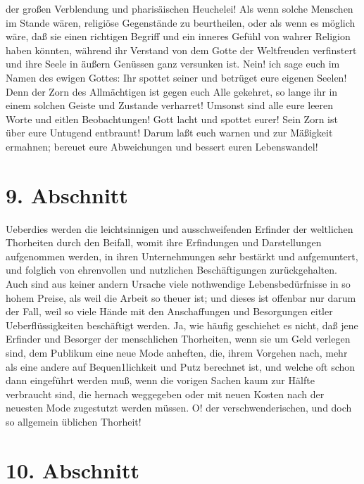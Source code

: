 der großen Verblendung und pharisäischen Heuchelei! Als wenn solche Menschen im
Stande wären, religiöse Gegenstände zu beurtheilen, oder als wenn es möglich
wäre, daß sie einen richtigen Begriff und ein inneres Gefühl von wahrer Religion
haben könnten, während ihr Verstand von dem Gotte der Weltfreuden verfinstert
und ihre Seele in äußern Genüssen ganz versunken ist. Nein! ich sage euch im
Namen des ewigen Gottes: Ihr spottet seiner und betrüget eure eigenen Seelen!
Denn der Zorn des Allmächtigen ist gegen euch Alle gekehret, so lange ihr in
einem solchen Geiste und Zustande verharret! Umsonst sind alle eure leeren Worte
und eitlen Beobachtungen! Gott lacht und spottet eurer! Sein Zorn ist über eure
Untugend entbraunt! Darum laßt euch warnen und zur Mäßigkeit ermahnen; bereuet
eure Abweichungen und bessert euren Lebenswandel!

\section{9. Abschnitt} \label{kap17_ab9}

Ueberdies werden die leichtsinnigen und ausschweifenden Erfinder der weltlichen
Thorheiten durch den Beifall, womit ihre Erfindungen und Darstellungen
aufgenommen werden, in ihren Unternehmungen sehr bestärkt und aufgemuntert, und
folglich von ehrenvollen und nutzlichen Beschäftigungen zurückgehalten. Auch
sind aus keiner andern Ursache viele nothwendige Lebensbedürfnisse in so hohem
Preise, als weil die Arbeit so theuer ist; und dieses ist offenbar nur darum der
Fall, weil so viele Hände mit den Anschaffungen und Besorgungen eitler
Ueberflüssigkeiten beschäftigt werden. Ja, wie häufig geschiehet es nicht, daß
jene Erfinder und Besorger der menschlichen Thorheiten, wenn sie um Geld
verlegen sind, dem Publikum eine neue Mode anheften, die, ihrem Vorgehen nach,
mehr als eine andere auf Bequen1lichkeit und Putz berechnet ist, und welche oft
schon dann eingeführt werden muß, wenn die vorigen Sachen kaum zur Hälfte
verbraucht sind, die hernach weggegeben oder mit neuen Kosten nach der neuesten
Mode zugestutzt werden müssen. O! der verschwenderischen, und doch so allgemein
üblichen Thorheit!

\section{10. Abschnitt} \label{kap17_ab10}

